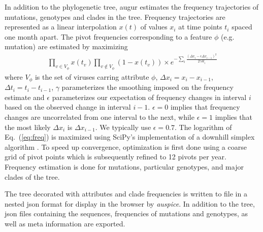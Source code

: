 \documentclass{bioinfo}
\newcommand{\EQ}[1]{Eq.~(\ref{eq:#1})}
\newcommand{\auspice}{\textit{auspice}}
\begin{document}
In addition to the phylogenetic tree, augur estimates the frequency trajectories of mutations, genotypes and clades in the tree. 
Frequency trajectories are represented as a linear interpolation $x(t)$ of values $x_i$ at time points $t_i$ spaced one month apart. 
The pivot frequencies corresponding to a feature $\phi$ (e.g. mutation) are estimated by maximizing
\begin{equation}
\label{eq:freq}
	\begin{split}
	\prod_{v\in V_\phi}x(t_v)\prod_{v\notin V_{\phi}}(1-x(t_v))\times e^{ 
			-\sum_i \frac{(\Delta x_i - \epsilon\Delta x_{i-1})^2}{2\gamma \delta t_i}
			}
\end{split}
\end{equation}
where $V_{\phi}$ is the set of viruses carring attribute $\phi$, $\Delta x_i = x_i-x_{i-1}$, $\Delta t_i = t_i-t_{i-1}$, $\gamma$ parameterizes the smoothing imposed on the frequency estimate and $\epsilon$ parameterizes our expectation of frequency changes in interval $i$ based on the observed change in interval $i-1$.
$\epsilon=0$ implies that frequency changes are uncorrelated from one interval to the next, while $\epsilon=1$ implies that the most likely $\Delta x_i$ is $\Delta x_{i-1}$.
We typically use $\epsilon = 0.7$.
The logarithm of \EQ{freq} is maximized using SciPy's implementation of a downhill simplex algorithm \citep{Oliphant:2007p25672}.
To speed up convergence, optimization is first done using a coarse grid of pivot points which is subsequently refined to 12 pivots per year. Frequency estimation is done for mutations, particular genotypes, and major clades of the tree.

The tree decorated with attributes and clade frequencies is written to file in a nested json format for display in the browser by \auspice.
In addition to the tree, json files containing the sequences, frequencies of mutations and genotypes, as well as meta information are exported.
\end{document}

